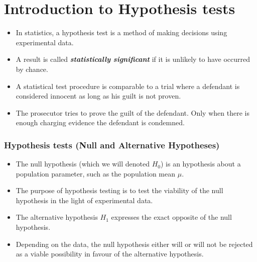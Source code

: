 \documentclass[]{report}
\begin{document}
\section{Introduction to Hypothesis tests}

\begin{itemize} \item
In statistics, a  hypothesis test is a method of making decisions using experimental data. \item A result is called \textbf{\emph{statistically significant}} if it is unlikely to have occurred by chance. \item A statistical test procedure is comparable to a trial where a defendant is considered innocent as long as his guilt is not proven.\item  The prosecutor tries to prove the guilt of the defendant. Only when there is enough charging evidence the defendant is condemned.
\end{itemize}





\subsubsection{Hypothesis tests (Null and Alternative Hypotheses) }

\begin{itemize}
\item The null hypothesis (which we will denoted $H_0$) is an hypothesis about a population parameter, such as the population mean $\mu$. \item The purpose of hypothesis testing is to test the viability of the null hypothesis in the light of experimental data. \item The alternative hypothesis $H_1$ expresses the exact opposite of the null hypothesis. \item Depending on the data, the null hypothesis either will or will not be rejected as a viable possibility in favour of the alternative hypothesis.
\end{itemize}
\end{document}
